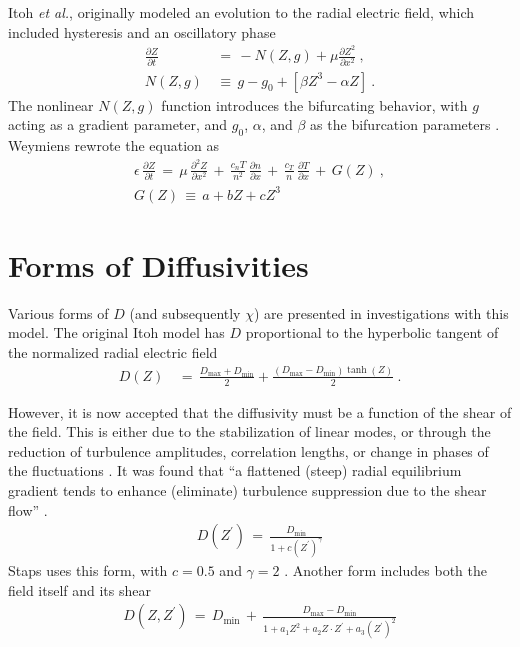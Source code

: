 Itoh \emph{et al.}, originally modeled an evolution to the radial electric field, which included hysteresis and an oscillatory phase \cite{itoh_edge_1991}
\begin{align} %
	\frac{\partial Z}{\partial t} \,&=\, -N(Z,g) + \mu \frac{\partial Z^2}{\partial x^2}~,\label{eq:original_z} \\
	N(Z,g) \,&\equiv\, g - g_0 + \left[\beta Z^3 - \alpha Z\right]~.
\end{align}
The nonlinear $N(Z,g)$ function introduces the bifurcating behavior, with $g$ acting as a gradient parameter, and $g_0$, $\alpha$, and $\beta$ as the bifurcation parameters \cite{itoh_model_1988}.
Weymiens \cite{weymiens_bifurcation_2012} rewrote the equation as
\begin{align} %
	\epsilon \, \frac{\partial Z}{\partial t} \,=\, \mu \, \frac{\partial^2 Z}{\partial x^2} \,+\,
		\frac{c_n T}{n^2} \, \frac{\partial n}{\partial x} \,+\,
		\frac{c_T}{n} \, \frac{\partial T}{\partial x} \,+\, G(Z)~,\label{eq:paquay_Z} \\
	G(Z) \,\equiv\, a + bZ + cZ^3 \label{eq:G_polynomial}
\end{align}

\section{Forms of Diffusivities}\label{sec:diffusivities}
Various forms of $D$ (and subsequently $\chi$) are presented in investigations with this model.
The original Itoh model has $D$ proportional to the hyperbolic tangent of the normalized radial electric field \cite{itoh_edge_1991, zohm_dynamic_1994}
\begin{align} %
	D(Z) \,&=\, \frac{D_\text{max} + D_\text{min}}{2} +
		\frac{(D_\text{max} - D_\text{min})\tanh(Z)}{2}~. \label{eq:Itoh_diffusivity}
\end{align}

However, it is now accepted that the diffusivity must be a function of the shear of the field.
This is either due to the stabilization of linear modes, or through the reduction of turbulence amplitudes, correlation lengths, or change in phases of the fluctuations \cite{connor_review_2000}.
It was found that ``a flattened (steep) radial equilibrium gradient tends to enhance (eliminate) turbulence suppression due to the shear flow'' \cite{zhang_edge_1992}.
\begin{align} %
	D(Z^{\prime}) \,=\, \frac{D_\text{min}}{1 + c(Z^{\prime})^{\gamma}} \label{eq:shear_diffusivity}
\end{align}
Staps uses this form, with $c = 0.5$ and $\gamma = 2$ \cite{staps_backstepping_2017}.
Another form includes both the field itself and its shear \cite{paquay_studying_2012}
\begin{align} %
	D(Z, Z^{\prime}) \,=\, D_\text{min} \,+\, \frac{D_\text{max} - D_\text{min}}{1 + a_1 Z^2 + a_2 Z \cdot Z^{\prime} + a_3 (Z^{\prime})^2} \label{eq:flow-shear}
\end{align}

